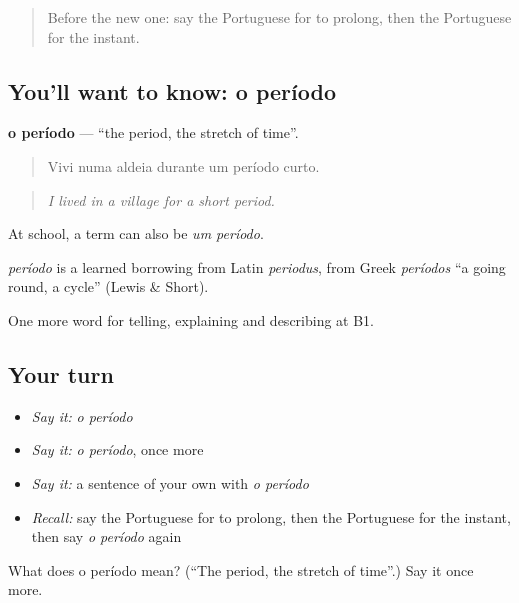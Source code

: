 \begin{quote}
Before the new one: say the Portuguese for to prolong, then the Portuguese for the instant.
\end{quote}

\subsection*{You'll want to know: o período}
\textbf{o período} — \textquotedblleft{}the period, the stretch of time\textquotedblright{}.

\begin{quote}
Vivi numa aldeia durante um período curto.
\end{quote}

\begin{quote}
\emph{I lived in a village for a short period.}
\end{quote}

At school, a term can also be \emph{um período}.

\begin{cousinweb}
\emph{período} is a learned borrowing from Latin \emph{periodus}, from Greek \emph{períodos} \textquotedblleft{}a going round, a cycle\textquotedblright{} (Lewis \& Short).
\end{cousinweb}

\begin{grammarlens}[title={What you've built}]
One more word for telling, explaining and describing at B1.
\end{grammarlens}

\subsection*{Your turn}
\begin{itemize}
\raggedright
  \item \emph{Say it:} \emph{o período}
  \item \emph{Say it:} \emph{o período}, once more
  \item \emph{Say it:} a sentence of your own with \emph{o período}
  \item \emph{Recall:} say the Portuguese for to prolong, then the Portuguese for the instant, then say \emph{o período} again
\end{itemize}

\begin{tcolorbox}[breakable,colback=teal!4,colframe=teal!35!black,title={Before you move on}]
What does o período mean? (\textquotedblleft{}The period, the stretch of time\textquotedblright{}.) Say it once more.
\end{tcolorbox}
